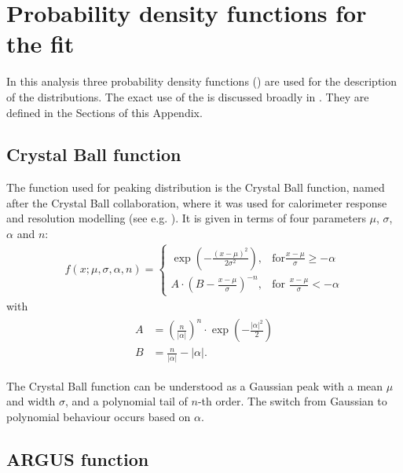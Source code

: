 \chapter{Probability density functions for the \texorpdfstring{\Mbc}{Mbc} fit}\label{sec:appendix_fitting_functions}
In this analysis three probability density functions () are used for the description of the \Mbc distributions.
The exact use of the  is discussed broadly in .
They are defined in the Sections of this Appendix.

\section{Crystal Ball function}\label{sec:crystal_Ball}

The function used for peaking \Mbc distribution is the Crystal Ball function, named after the Crystal Ball collaboration, where it was used for calorimeter response and resolution modelling (see e.g. \cite{Skwarnicki:1986xj}).
It is given in terms of four parameters $\mu$, $\sigma$, $\alpha$ and $n$:
\begin{align}\label{eq:crystal_ball}
    f(x;\mu, \sigma, \alpha, n) =  
    \begin{cases} 
    \exp(- \frac{(x - \mu)^2}{2 \sigma^2}), & \mbox{for}\frac{x - \mu}{\sigma} \geqslant -\alpha \\
    A \cdot (B - \frac{x - \mu}{\sigma})^{-n}, & \mbox{for }\frac{x - \mu}{\sigma} < -\alpha 
    \end{cases}
\end{align}
with
\begin{align}
    \begin{split}
    A &= \left(\frac{n}{\left| \alpha \right|}\right)^n \cdot \exp\left(- \frac {\left|\alpha \right|^2}{2}\right)\\
    B   &= \frac{n}{\left| \alpha \right|}  - \left| \alpha \right|.
    \end{split}
\end{align}

The Crystal Ball function can be understood as a Gaussian peak with a mean $\mu$ and width $\sigma$, 
and a polynomial tail of $n$-th order.
The switch from Gaussian to polynomial behaviour occurs based on $\alpha$.

\section{ARGUS function}\label{sec:argus_distribution}

